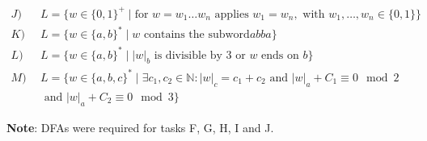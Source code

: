 \documentclass{article}
\begin{document}
\begin{align*}
    J) \ \ & L = \{ w \in \{0, 1\}^+ \mid \text{for } w=w_1 \dots w_n \text{ applies } w_1 = w_n, \text{ with } w_1, \dots, w_n \in \{0, 1\}\}\\
    K) \ \ & L = \{ w \in \{a, b\}^* \mid w \text{ contains the subword} abba \}\\
    L) \ \ & L = \{ w \in \{a, b\}^* \mid |w|_b \text{ is divisible by 3 or }  w \text{ ends on } b \} \\
    M) \ \ & L = \{ w \in \{a, b, c\}^* \mid \exists c_1, c_2 \in \mathbb{N}: |w|_c = c_1 + c_2 \text{ and } |w|_a + C_1 \equiv 0 \mod 2 \\
    & \text{ and } |w|_a + C_2 \equiv 0 \mod 3 \}
\end{align*}

\textbf{Note}: DFAs were required for tasks F, G, H, I and J.
\end{document}
